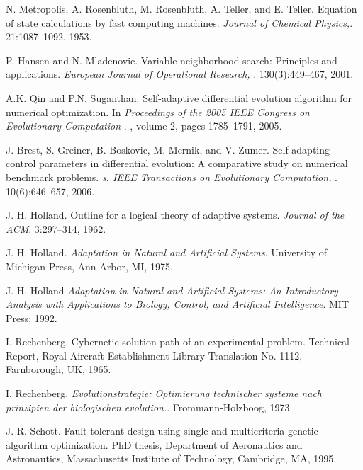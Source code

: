 \begin{thebibliography}{9}
    N. Metropolis, A. Rosenbluth, M. Rosenbluth, A. Teller, and E. Teller. Equation of state
    calculations by fast computing machines.
    \textit{Journal of Chemical Physics,}. 
    21:1087–1092, 1953.  
    
    P. Hansen and N. Mladenovic. Variable neighborhood search: Principles and applications.
    \textit{European Journal of Operational Research, }. 
    130(3):449–467, 2001.  
    
    A.K. Qin and P.N. Suganthan. Self-adaptive differential evolution algorithm for numerical optimization. In
    \textit{Proceedings of the 2005 IEEE Congress on Evolutionary Computation }. 
    , volume 2, pages 1785–1791, 2005.      
    
    J. Brest, S. Greiner, B. Boskovic, M. Mernik, and V. Zumer. Self-adapting control
    parameters in differential evolution: A comparative study on numerical benchmark
    problems.
    \textit{s. IEEE Transactions on Evolutionary Computation, }. 
    10(6):646–657, 2006.   
    
     J. H. Holland. Outline for a logical theory of adaptive systems.
    \textit{Journal of the ACM}. 
    3:297–314, 1962.
    
     J. H. Holland.
    \textit{Adaptation in Natural and Artificial Systems}. 
    University of Michigan Press, Ann Arbor, MI, 1975.

    J. H. Holland 
    \textit{Adaptation in Natural and Artificial Systems: An Introductory Analysis with Applications to Biology, Control, and Artificial Intelligence}. 
    MIT Press; 1992.


    I. Rechenberg.
    Cybernetic solution path of an experimental problem. 
    Technical Report, Royal Aircraft Establishment Library Translation No. 1112, Farnborough, UK, 1965.

    I. Rechenberg.
    \textit{Evolutionstrategie: Optimierung technischer systeme nach prinzipien der biologischen evolution.}. 
    Frommann-Holzboog, 1973.

    J. R. Schott.
    Fault tolerant design using single and multicriteria genetic algorithm optimization. 
    PhD thesis, Department of Aeronautics and Astronautics, Massachusetts Institute of Technology, Cambridge, MA, 1995.


\end{thebibliography}
